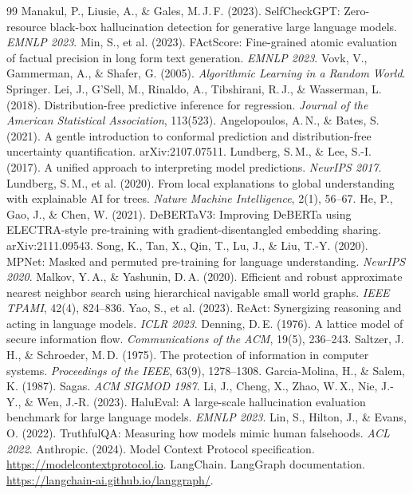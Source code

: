 \documentclass[11pt,a4paper]{article}
\begin{document}
\begin{thebibliography}{99}\small
{} Manakul, P., Liusie, A., \& Gales, M.\,J.\,F. (2023). SelfCheckGPT: Zero-resource black-box hallucination detection for generative large language models. \textit{EMNLP 2023}.
 Min, S., et al. (2023). FActScore: Fine-grained atomic evaluation of factual precision in long form text generation. \textit{EMNLP 2023}.
 Vovk, V., Gammerman, A., \& Shafer, G. (2005). \textit{Algorithmic Learning in a Random World}. Springer.
 Lei, J., G'Sell, M., Rinaldo, A., Tibshirani, R.\,J., \& Wasserman, L. (2018). Distribution-free predictive inference for regression. \textit{Journal of the American Statistical Association}, 113(523).
 Angelopoulos, A.\,N., \& Bates, S. (2021). A gentle introduction to conformal prediction and distribution-free uncertainty quantification. arXiv:2107.07511.
 Lundberg, S.\,M., \& Lee, S.-I. (2017). A unified approach to interpreting model predictions. \textit{NeurIPS 2017}.
 Lundberg, S.\,M., et al. (2020). From local explanations to global understanding with explainable AI for trees. \textit{Nature Machine Intelligence}, 2(1), 56--67.
 He, P., Gao, J., \& Chen, W. (2021). DeBERTaV3: Improving DeBERTa using ELECTRA-style pre-training with gradient-disentangled embedding sharing. arXiv:2111.09543.
 Song, K., Tan, X., Qin, T., Lu, J., \& Liu, T.-Y. (2020). MPNet: Masked and permuted pre-training for language understanding. \textit{NeurIPS 2020}.
 Malkov, Y.\,A., \& Yashunin, D.\,A. (2020). Efficient and robust approximate nearest neighbor search using hierarchical navigable small world graphs. \textit{IEEE TPAMI}, 42(4), 824--836.
 Yao, S., et al. (2023). ReAct: Synergizing reasoning and acting in language models. \textit{ICLR 2023}.
 Denning, D.\,E. (1976). A lattice model of secure information flow. \textit{Communications of the ACM}, 19(5), 236--243.
 Saltzer, J.\,H., \& Schroeder, M.\,D. (1975). The protection of information in computer systems. \textit{Proceedings of the IEEE}, 63(9), 1278--1308.
 Garcia-Molina, H., \& Salem, K. (1987). Sagas. \textit{ACM SIGMOD 1987}.
 Li, J., Cheng, X., Zhao, W.\,X., Nie, J.-Y., \& Wen, J.-R. (2023). HaluEval: A large-scale hallucination evaluation benchmark for large language models. \textit{EMNLP 2023}.
 Lin, S., Hilton, J., \& Evans, O. (2022). TruthfulQA: Measuring how models mimic human falsehoods. \textit{ACL 2022}.
 Anthropic. (2024). Model Context Protocol specification. \url{https://modelcontextprotocol.io}.
 LangChain. LangGraph documentation. \url{https://langchain-ai.github.io/langgraph/}.
\end{thebibliography}
\end{document}
